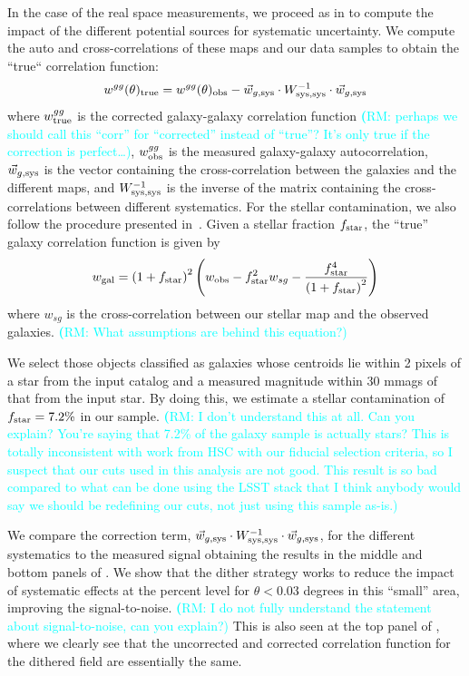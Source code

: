 \documentclass[twocolumn]{aastex62}
\newcommand{\rachel}[1]{{\textcolor{cyan}{{\textbf (RM: #1)}}}}
\begin{document}
In the case of the real space measurements, we proceed as in \citet{2016MNRAS.455.4301C} to compute the impact of the different potential sources for systematic uncertainty. We compute the auto and cross-correlations of these maps and our data samples to obtain the ``true`` correlation function:
\begin{equation}
w^{gg}(\theta)_{\rm true} =w^{gg}(\theta)_{\rm obs} -  \vec{w}_{g,{\rm sys}} \cdot W_{\rm sys,sys}^{-1} \cdot \vec{w}_{g,{\rm sys}}
\end{equation}
where $w^{gg}_{\rm true}$ is the corrected galaxy-galaxy correlation function \rachel{perhaps we should call this ``corr'' for ``corrected'' instead of ``true''?  It's only true if the correction is perfect\dots}, $w^{gg}_{\rm obs}$ is the measured galaxy-galaxy autocorrelation, $\vec{w}_{g,{\rm sys}}$ is the vector containing the cross-correlation between the galaxies and the different maps, and $W_{\rm sys,sys}^{-1}$ is the inverse of the matrix containing the cross-correlations between different systematics. For the stellar contamination, we also follow the procedure presented in~\citet{2016MNRAS.455.4301C}. Given a stellar fraction $f_{\rm star}$, the ``true'' galaxy correlation function is given by
\begin{equation}
w_{\rm gal} = \left(1+f_{\rm star}\right)^{2}\left(w_{\rm obs} - f_{\rm star}^{2}w_{sg} - \frac{f_{\rm star}^{4}}{\left(1+f_{\rm star}\right)^{2}}\right)
\end{equation}
where $w_{sg}$ is the cross-correlation between our stellar map and the observed galaxies. \rachel{What assumptions are behind this equation?}

We select those objects classified as galaxies whose centroids lie within 2 pixels of a star from the input catalog and a measured magnitude within 30 mmags of that from the input star. By doing this, we estimate a stellar contamination of $f_{\rm star}=7.2\%$ in our sample. \rachel{I don't understand this at all.  Can you explain?  You're saying that 7.2\% of the galaxy sample is actually stars?  This is totally inconsistent with work from HSC with our fiducial selection criteria, so I suspect that our cuts used in this analysis are not good.  This result is so bad compared to what can be done using the LSST stack that I think anybody would say we should be redefining our cuts, not just using this sample as-is.}

We compare the correction term, $\vec{w}_{g,{\rm sys}} \cdot W_{\rm sys,sys}^{-1} \cdot \vec{w}_{g,{\rm sys}}$, for the different systematics to the measured signal obtaining the results in the middle and bottom panels of . We show that the dither strategy works to reduce the impact of systematic effects at the percent level for $\theta < 0.03$ degrees in this ``small'' area, improving the signal-to-noise. \rachel{I do not fully understand the statement about signal-to-noise, can you explain?} This is also seen at the top panel of , where we clearly see that the uncorrected and corrected correlation function for the dithered field are essentially the same.
\end{document}
